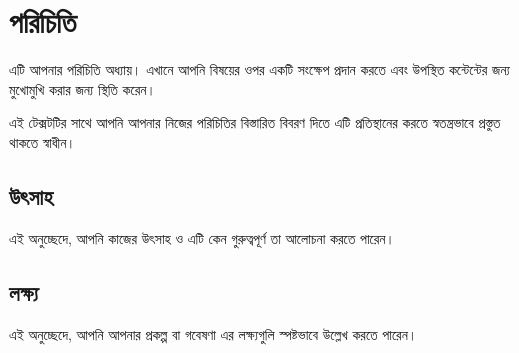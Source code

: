 \chapter{পরিচিতি}

এটি আপনার পরিচিতি অধ্যায়। এখানে আপনি বিষয়ের ওপর একটি সংক্ষেপ প্রদান করতে এবং উপস্থিত কন্টেন্টের জন্য মুখোমুখি করার জন্য স্থিতি করেন।

এই টেক্সটটির সাথে আপনি আপনার নিজের পরিচিতির বিস্তারিত বিবরণ দিতে এটি প্রতিস্থানের করতে স্বতন্ত্রভাবে প্রস্তুত থাকতে স্বাধীন।

\section{উৎসাহ}

এই অনুচ্ছেদে, আপনি কাজের উৎসাহ ও এটি কেন গুরুত্বপূর্ণ তা আলোচনা করতে পারেন।

\section{লক্ষ্য}

এই অনুচ্ছেদে, আপনি আপনার প্রকল্প বা গবেষণা এর লক্ষ্যগুলি স্পষ্টভাবে উল্লেখ করতে পারেন।

